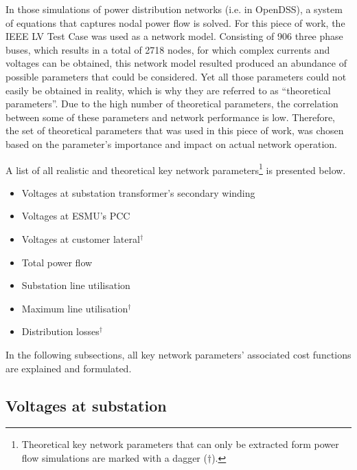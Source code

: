 In those simulations of power distribution networks (i.e. in OpenDSS), a system of equations that captures nodal power flow is solved.
For this piece of work, the IEEE LV Test Case was used as a network model.
Consisting of 906 three phase buses, which results in a total of 2718 nodes, for which complex currents and voltages can be obtained, this network model resulted produced an abundance of possible parameters that could be considered.
Yet all those parameters could not easily be obtained in reality, which is why they are referred to as ``theoretical parameters''.
Due to the high number of theoretical parameters, the correlation between some of these parameters and network performance is low.
Therefore, the set of theoretical parameters that was used in this piece of work, was chosen based on the parameter's importance and impact on actual network operation.

A list of all realistic and theoretical key network parameters\footnote[1]{Theoretical key network parameters that can only be extracted form power flow simulations are marked with a dagger ($\dagger$).} is presented below.

\begin{itemize}
	\item Voltages at substation transformer's secondary winding
	\item Voltages at ESMU's PCC
	\item Voltages at customer lateral$^{\dagger}$
	\item Total power flow
	\item Substation line utilisation
	\item Maximum line utilisation$^{\dagger}$
	\item Distribution losses$^{\dagger}$
\end{itemize}

In the following subsections, all key network parameters' associated cost functions are explained and formulated.

\subsection{Voltages at substation}
\label{ch1:subsec:voltages-at-substation}


